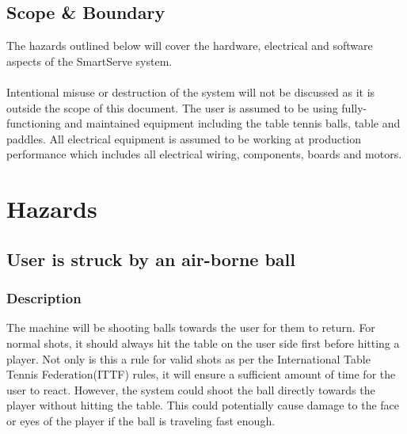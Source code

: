 \documentclass[11pt]{article}
\begin{document}
\subsection{Scope \& Boundary}
The hazards outlined below will cover the hardware, electrical and software aspects of the SmartServe system. \\ \\
Intentional misuse or destruction of the system will not be discussed as it is outside the scope of this document. The user is assumed to be using fully-functioning and maintained equipment including the table tennis balls, table and paddles. All electrical equipment is assumed to be working at production performance which includes all electrical wiring, components, boards and motors.   
\section{Hazards}
\subsection{User is struck by an air-borne ball}
\subsubsection*{Description}
The machine will be shooting balls towards the user for them to return. For normal shots, it should always hit the table on the user side first before hitting a player. Not only is this a rule for valid shots as per the International Table Tennis Federation(ITTF) rules, it will ensure a sufficient amount of time for the user to react. However, the system could shoot the ball directly towards the player without hitting the table. This could potentially cause damage to the face or eyes of the player if the ball is traveling fast enough.
\end{document}
